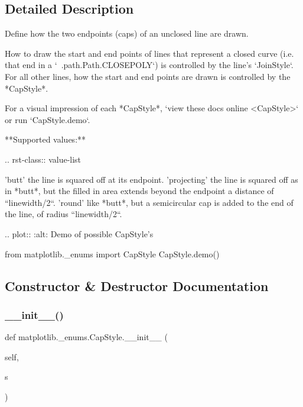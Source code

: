\subsection{Detailed Description}
\begin{DoxyVerb}Define how the two endpoints (caps) of an unclosed line are drawn.

How to draw the start and end points of lines that represent a closed curve
(i.e. that end in a `~.path.Path.CLOSEPOLY`) is controlled by the line's
`JoinStyle`. For all other lines, how the start and end points are drawn is
controlled by the *CapStyle*.

For a visual impression of each *CapStyle*, `view these docs online
<CapStyle>` or run `CapStyle.demo`.

**Supported values:**

.. rst-class:: value-list

    'butt'
        the line is squared off at its endpoint.
    'projecting'
        the line is squared off as in *butt*, but the filled in area
        extends beyond the endpoint a distance of ``linewidth/2``.
    'round'
        like *butt*, but a semicircular cap is added to the end of the
        line, of radius ``linewidth/2``.

.. plot::
    :alt: Demo of possible CapStyle's

    from matplotlib._enums import CapStyle
    CapStyle.demo()\end{DoxyVerb}
 

\subsection{Constructor \& Destructor Documentation}
\mbox{\label{classmatplotlib_1_1__enums_1_1CapStyle_abba3aca97310565d9d5ae40e2d2a4986}} 
\subsubsection{\texorpdfstring{\+\_\+\+\_\+init\+\_\+\+\_\+()}{\_\_init\_\_()}}
{\footnotesize\ttfamily def matplotlib.\+\_\+enums.\+Cap\+Style.\+\_\+\+\_\+init\+\_\+\+\_\+ (\begin{DoxyParamCaption}\item[{}]{self,  }\item[{}]{s }\end{DoxyParamCaption})}




